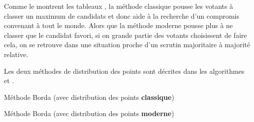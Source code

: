 \documentclass[../report]{subfiles}
\begin{document}
  Comme le montrent les tableaux , la méthode classique pousse 
  les votants à classer un maximum de candidats et donc aide à la recherche d'un 
  compromis convenant à tout le monde.
  Alors que la méthode moderne pousse plus à ne classer que le candidat favori, si on grande
  partie des votants choisissent de faire cela, on se retrouve dans une situation proche 
  d'un scrutin majoritaire à majorité relative.

  Les deux méthodes de distribution des points sont décrites dans les algorithmes  et .

  \begin{algorithm}
    \caption{Méthode Borda (avec distribution des points \textbf{classique})}%
    \label{scrutin:borda-classique}
    \begin{algorithmic}[1]
      \ENDFOR{}
      \ENDFOR{}
  \end{algorithmic}
  \end{algorithm}
  
  \begin{algorithm}
    \caption{Méthode Borda (avec distribution des points \textbf{moderne})}%
    \label{scrutin:borda-moderne}
    \begin{algorithmic}[1]
      \ENDFOR{}
      \ENDFOR{}
    \end{algorithmic}
  \end{algorithm}
\end{document}
